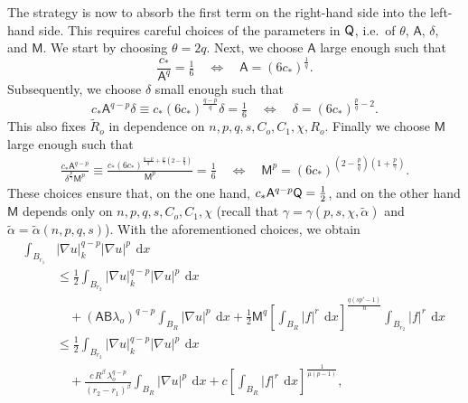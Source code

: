 \documentclass[10pt,letterpaper]{amsart}
\theoremstyle{definition}
\numberwithin{theorem}{section}
\numberwithin{equation}{section}
\newcommand{\1}{\ensuremath{\mathds{1}}}
\renewcommand{\d}{\:\! \mathrm{d}}
\numberwithin{equation}{section}
\begin{document}
The strategy is now to absorb the first term on the right-hand side into the left-hand side. This requires careful choices of the parameters in ${\sf Q}$, i.e.~of $\theta$, $\mathsf A$, $\delta$, and $\mathsf M$.
We start by choosing $\theta = 2q$. Next, we choose $\mathsf A$ large enough such that
\begin{equation*}
     \frac{c_\ast}{\mathsf A^{q}} 
    = 
    \tfrac 16\quad\Longleftrightarrow\quad
    \mathsf A=
     (6c_\ast)^\frac1{q}.
\end{equation*}
Subsequently, we choose $\delta$ 
small enough such that 
\begin{equation*}
    c_\ast \mathsf A^{q-p} \delta \equiv 
    c_\ast(6 c_\ast)^{\frac{q-p}{q}}\delta
    = \tfrac16\quad\Longleftrightarrow\quad
    \delta= (6c_\ast)^{\frac{p}{q}-2}.
\end{equation*}
This also fixes $\widetilde R_o$ in dependence on $n,p,q,s,C_o,C_1,\chi, R_o$. Finally we choose $\mathsf M$ large enough such that 
\begin{align*}
    \frac{c_\ast \mathsf A^{q-p}}{\delta^\frac{p}{\gamma} \mathsf M^p} 
    \equiv
    \frac{c_\ast (6c_\ast)^{\frac{q-p}{q} + \frac{p}{\gamma} (2-\frac{p}{q})}}{\mathsf M^p}
    = 
    \tfrac16
    \quad\Longleftrightarrow\quad
    \mathsf M^p=(6c_\ast)^{(2-\frac{p}{q}) (1+ \frac{p}{\gamma})}.
\end{align*}
These choices ensure that, on the one hand, $c_\ast  \mathsf A^{q-p} {\sf Q}=\frac12$, and on the other hand $\mathsf M$ depends only on $n,p,q,s,C_o,C_1,\chi$ (recall that $\gamma=\gamma(p,s,\chi,\tilde{\alpha})$ and $\tilde{\alpha} = \tilde{\alpha}(n,p,q,s)$). 
With the aforementioned choices, we obtain
\begin{align*}
    \int_{B_{r_1}} &|\nabla u|_k^{q-p} |\nabla u|^p  \, \d x \\
    &\leq 
   \tfrac12 \int_{B_{r_2}} |\nabla u|_k^{q-p} |\nabla u|^p  \, \d x \\
   &\quad +  
   (\mathsf A\mathsf B\lambda_o)^{q-p} \int_{B_{R}} |\nabla u|^p \, \d x  + 
    \tfrac12 \mathsf M^{q} \left[ \int_{B_R} |f|^{r} \, \d x \right]^\frac{q(sp'-1)}{n} \int_{B_{r_2}} |f|^{r} \, \d x \\
    &\leq 
    \tfrac12 \int_{B_{r_2}} |\nabla u|_k^{q-p} |\nabla u|^p \, \d x \\
    &\quad + 
    \frac{c\, R^\beta\, \lambda_o^{q-p}}{(r_2-r_1)^{\beta }} \int_{B_R} |\nabla u|^p \, \d x  + 
    c \left[ \int_{B_R} |f|^{r} \, \d x \right]^\frac{1}{\mu (p-1)},
\end{align*}
\end{document}
